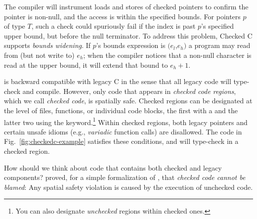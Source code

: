 The \checkedc compiler will instrument loads and stores of checked
pointers to confirm the pointer is non-null, and the access is within
the specified bounds. For pointers $p$ of type
$T$\code{>}, such a check could spuriously fail if
the index is past $p$'s specified upper bound, but before the null
terminator. To address this problem, Checked C supports \emph{bounds
  widening}.
If $p$'s bounds expression is $(e_l$,$e_h)$ a program may read from (but not
write to) $e_h$; when the compiler notices that a non-null character
is read at the upper bound, it will extend that bound to $e_h+1$.

%
\checkedc is backward compatible with legacy C in the sense that all
legacy code will type-check and compile. However, only code that
appears in \emph{checked code regions}, which we call \emph{checked code},
is spatially safe. Checked regions can be designated at the level of
files, functions, or individual code blocks, the first with a
 and the latter two using the 
keyword.\footnote{You can also designate \emph{unchecked} regions
  within checked ones.}  Within checked regions, both
legacy pointers and certain unsafe idioms (e.g., \emph{variadic} function
calls) are disallowed. The code in Fig.~\ref{fig:checkedc-example}
satisfies these conditions, and will type-check in a checked region.

How should we think about code that contains both checked and legacy
components? \citet{li22checkedc} proved, for a simple
formalization of \checkedc, that \emph{checked code cannot be blamed}:
Any spatial safety violation is caused by the execution of unchecked
code. 

